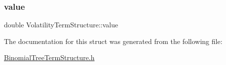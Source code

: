 \hypertarget{structVolatilityTermStructure_ab8eb66663708740d8de5f5904f3f462e}{}\label{structVolatilityTermStructure_ab8eb66663708740d8de5f5904f3f462e} 
\subsubsection{\texorpdfstring{value}{value}}
{\footnotesize\ttfamily double Volatility\+Term\+Structure\+::value}



The documentation for this struct was generated from the following file\+:\begin{DoxyCompactItemize}
\item 
\hyperlink{BinomialTreeTermStructure_8h}{Binomial\+Tree\+Term\+Structure.\+h}\end{DoxyCompactItemize}

